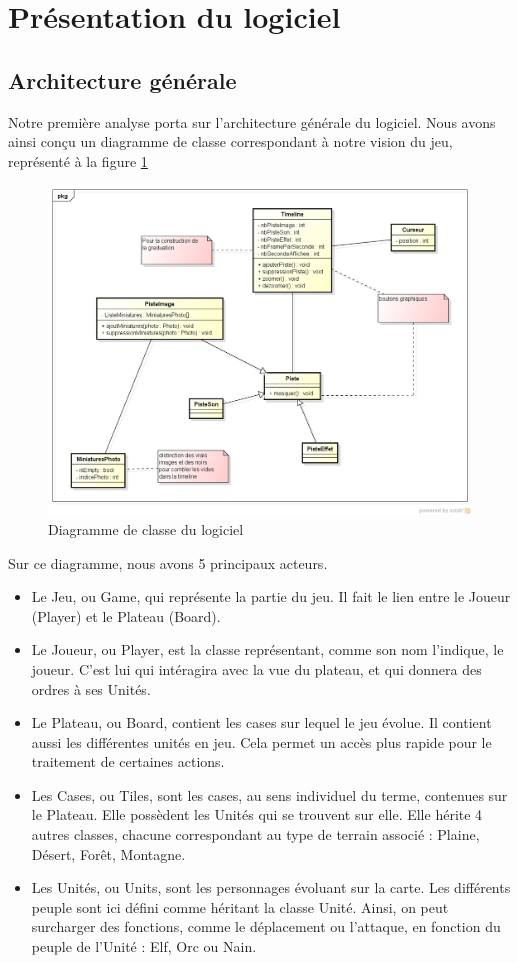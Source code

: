 \section{Présentation du logiciel}

\subsection{Architecture générale}
Notre première analyse porta sur l'architecture générale du logiciel. Nous avons ainsi conçu un diagramme de classe correspondant à notre vision du jeu, représenté à la figure \ref{classe}

\begin{figure}[!h] 
\centerline{\includegraphics[scale=0.60]{img/diag_class_ex.png}}
   \caption{\label{étiquette} Diagramme de classe du logiciel}
\label{classe}
\end{figure}

Sur ce diagramme, nous avons 5 principaux acteurs.
\begin{itemize}
  \item Le Jeu, ou Game, qui représente la partie du jeu. Il fait le lien entre le Joueur (Player) et le Plateau (Board). 
  \item Le Joueur, ou Player, est la classe représentant, comme son nom l'indique, le joueur. C'est lui qui intéragira avec la vue du plateau, et qui donnera des ordres à ses Unités.
  \item Le Plateau, ou Board, contient les cases sur lequel le jeu évolue. Il contient aussi les différentes unités en jeu. Cela permet un accès plus rapide pour le traitement de certaines actions.
  \item Les Cases, ou Tiles, sont les cases, au sens individuel du terme, contenues sur le Plateau. Elle possèdent les Unités qui se trouvent sur elle. Elle hérite 4 autres classes, chacune correspondant au type de terrain associé : Plaine, Désert, Forêt, Montagne.
  \item Les Unités, ou Units, sont les personnages évoluant sur la carte. Les différents peuple sont ici défini comme héritant la classe Unité. Ainsi, on peut surcharger des fonctions, comme le déplacement ou l'attaque, en fonction du peuple de l'Unité : Elf, Orc ou Nain.
\end{itemize}

